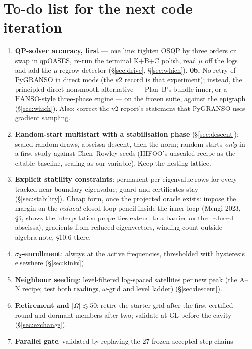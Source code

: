 \documentclass[11pt,a4paper]{article}
\newcommand{\revc}[1]{#1}
\newcommand{\revd}[1]{#1}
\newcommand{\revf}[1]{{\color{revf}#1}}
\begin{document}
\section{To-do list for the next code iteration}
\label{sec:todo}
\begin{enumerate}[leftmargin=1.8em,itemsep=1pt,start=0]
\item \textbf{QP-solver accuracy, first} --- one line: tighten OSQP by three orders or swap
in qpOASES, re-run the terminal K+B+C polish, read $\mu$ off the logs \revc{and add the
$\mu$-regrow detector} (\S\ref{sec:drive}, \S\ref{sec:which}).  \revd{\textbf{0b.} No retry of PyGRANSO in direct mode (the v2 record is that
experiment); instead, the principled direct-nonsmooth alternative --- Plan~B's bundle
inner, or a HANSO-style three-phase engine --- on the frozen suite, against the epigraph
(\S\ref{sec:which}).  Also: correct the v2 report's statement that PyGRANSO uses gradient
sampling.}
\item \textbf{Random-start multistart with a stabilisation phase} (\S\ref{sec:descent}):
scaled random draws, abscissa descent, then the norm; random starts \emph{only} in a
first study against Chen--Rowley seeds (HIFOO's unscaled recipe as the citable baseline,
scaling as our variable).  Keep the nesting lattice.
\item \textbf{Explicit stability constraints}: permanent per-eigenvalue rows for every
tracked near-boundary eigenvalue; guard and certificates stay (\S\ref{sec:stability}).
\revf{Cheap form, once the projected oracle exists: impose the margin on the
\emph{reduced} closed-loop pencil inside the inner loop (Mengi 2023, \S6, shows the
interpolation properties extend to a barrier on the reduced abscissa), gradients from
reduced eigenvectors, winding count outside --- algebra note, \S10.6 there.}
\item \textbf{$\sigma_2$-enrollment}: always at the active frequencies, thresholded with
hysteresis elsewhere (\S\ref{sec:kinks}).
\item \textbf{Neighbour seeding}: level-filtered log-spaced satellites per new peak
(the A--N recipe; test both readings, $\omega$-grid and level ladder) (\S\ref{sec:descent}).
\item \textbf{Retirement and $|\Omega|\lesssim50$}: retire the starter grid after the
first certified round and dormant members after two; validate at GL before the cavity
(\S\ref{sec:exchange}).
\item \textbf{Parallel gate}, validated by replaying the 27 frozen accepted-step chains

\end{enumerate}
\end{document}
